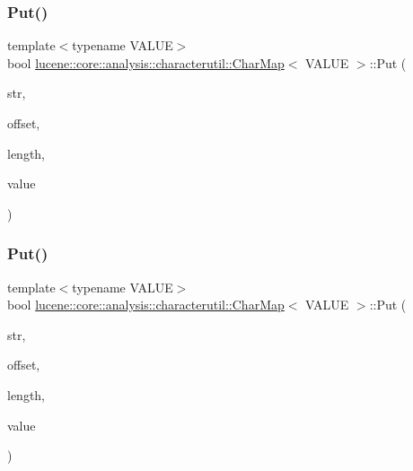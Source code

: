 \mbox{\label{classlucene_1_1core_1_1analysis_1_1characterutil_1_1CharMap_a09382e34715068e50efa4b40a34a4ee5}} 
\subsubsection{\texorpdfstring{Put()}{Put()}\hspace{0.1cm}{\footnotesize\ttfamily [1/4]}}
{\footnotesize\ttfamily template$<$typename V\+A\+L\+UE$>$ \\
bool \mbox{\hyperlink{classlucene_1_1core_1_1analysis_1_1characterutil_1_1CharMap}{lucene\+::core\+::analysis\+::characterutil\+::\+Char\+Map}}$<$ V\+A\+L\+UE $>$\+::Put (\begin{DoxyParamCaption}\item[{const char $\ast$}]{str,  }\item[{uint32\+\_\+t}]{offset,  }\item[{uint32\+\_\+t}]{length,  }\item[{V\+A\+L\+UE \&}]{value }\end{DoxyParamCaption})\hspace{0.3cm}{\ttfamily [inline]}}

\mbox{\label{classlucene_1_1core_1_1analysis_1_1characterutil_1_1CharMap_a3d7b46fba00e762804ba1e953ac6587d}} 
\subsubsection{\texorpdfstring{Put()}{Put()}\hspace{0.1cm}{\footnotesize\ttfamily [2/4]}}
{\footnotesize\ttfamily template$<$typename V\+A\+L\+UE$>$ \\
bool \mbox{\hyperlink{classlucene_1_1core_1_1analysis_1_1characterutil_1_1CharMap}{lucene\+::core\+::analysis\+::characterutil\+::\+Char\+Map}}$<$ V\+A\+L\+UE $>$\+::Put (\begin{DoxyParamCaption}\item[{const char $\ast$}]{str,  }\item[{uint32\+\_\+t}]{offset,  }\item[{uint32\+\_\+t}]{length,  }\item[{V\+A\+L\+UE \&\&}]{value }\end{DoxyParamCaption})\hspace{0.3cm}{\ttfamily [inline]}}


